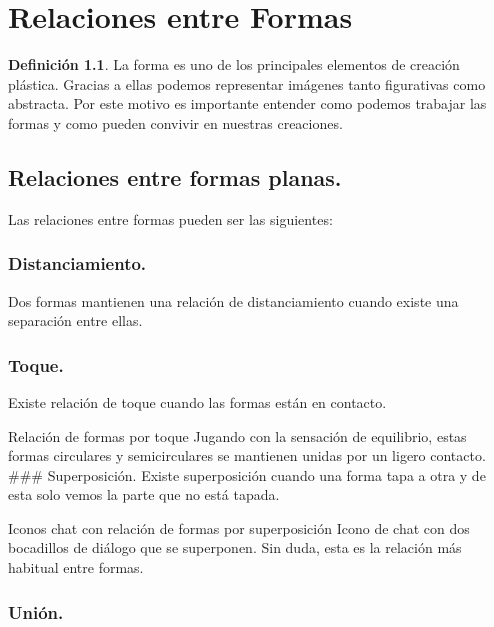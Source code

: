 \documentclass[
  16pt,
]{krantz}
\theoremstyle{definition}
\newtheorem{definition}{Definición}[chapter]
\theoremstyle{definition}
\theoremstyle{definition}
\theoremstyle{definition}
\theoremstyle{remark}
\begin{document}
\hypertarget{relaciones-entre-formas}{%
\chapter{Relaciones entre Formas}\label{relaciones-entre-formas}}

\begin{definition}
La forma es uno de los principales elementos de creación plástica. Gracias a ellas podemos representar imágenes tanto figurativas como abstracta. Por este motivo es importante entender como podemos trabajar las formas y como pueden convivir en nuestras creaciones.
\end{definition}

\hypertarget{relaciones-entre-formas-planas.}{%
\section{Relaciones entre formas planas.}\label{relaciones-entre-formas-planas.}}

Las relaciones entre formas pueden ser las siguientes:

\hypertarget{distanciamiento.}{%
\subsection{Distanciamiento.}\label{distanciamiento.}}

Dos formas mantienen una relación de distanciamiento cuando existe una separación entre ellas.

\hypertarget{toque.}{%
\subsection{Toque.}\label{toque.}}

Existe relación de toque cuando las formas están en contacto.

Relación de formas por toque
Jugando con la sensación de equilibrio, estas formas circulares y semicirculares se mantienen unidas por un ligero contacto.
\#\#\# Superposición.
Existe superposición cuando una forma tapa a otra y de esta solo vemos la parte que no está tapada.

Iconos chat con relación de formas por superposición
Icono de chat con dos bocadillos de diálogo que se superponen. Sin duda, esta es la relación más habitual entre formas.

\hypertarget{uniuxf3n.}{%
\subsection{Unión.}\label{uniuxf3n.}}
\end{document}
